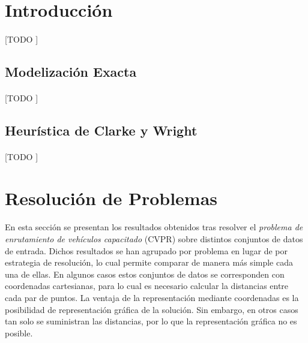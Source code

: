 \documentclass[spanish]{article}
\begin{document}
	\maketitle %

	\thispagestyle{fancy} %



	\begin{abstract}
		\noindent [TODO ]
	\end{abstract}


	\section{Introducción}
	\label{sec:intro}

		\paragraph{}
		[TODO ]

		\subsection{Modelización Exacta}
		\label{sec:exact_formulation}
			\paragraph{}
			[TODO ]

		\subsection{Heurística de Clarke y Wright}
		\label{sec:clarke_wright}
			\paragraph{}
			[TODO ]


	\section{Resolución de Problemas}

		\paragraph{}
		En esta sección se presentan los resultados obtenidos tras resolver el \emph{problema de enrutamiento de vehículos capacitado} (CVPR) sobre distintos conjuntos de datos de entrada. Dichos resultados se han agrupado por problema en lugar de por estrategia de resolución, lo cual permite comparar de manera más simple cada una de ellas. En algunos casos estos conjuntos de datos se corresponden con coordenadas cartesianas, para lo cual es necesario calcular la distancias entre cada par de puntos. La ventaja de la representación mediante coordenadas es la posibilidad de representación gráfica de la solución. Sin embargo, en otros casos tan solo se suministran las distancias, por lo que la representación gráfica no es posible.
\end{document}
